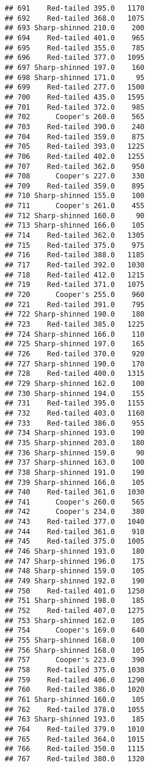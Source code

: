 \documentclass[
]{article}
\begin{document}
\begin{verbatim}
## 691    Red-tailed 395.0   1170
## 692    Red-tailed 368.0   1075
## 693 Sharp-shinned 210.0    200
## 694    Red-tailed 401.0    965
## 695    Red-tailed 355.0    785
## 696    Red-tailed 377.0   1095
## 697 Sharp-shinned 197.0    160
## 698 Sharp-shinned 171.0     95
## 699    Red-tailed 277.0   1500
## 700    Red-tailed 435.0   1595
## 701    Red-tailed 372.0    985
## 702      Cooper's 260.0    565
## 703    Red-tailed 390.0    240
## 704    Red-tailed 359.0    875
## 705    Red-tailed 393.0   1225
## 706    Red-tailed 402.0   1255
## 707    Red-tailed 362.0    950
## 708      Cooper's 227.0    330
## 709    Red-tailed 359.0    895
## 710 Sharp-shinned 155.0    100
## 711      Cooper's 261.0    455
## 712 Sharp-shinned 160.0     90
## 713 Sharp-shinned 166.0    105
## 714    Red-tailed 362.0   1305
## 715    Red-tailed 375.0    975
## 716    Red-tailed 388.0   1185
## 717    Red-tailed 392.0   1030
## 718    Red-tailed 412.0   1215
## 719    Red-tailed 371.0   1075
## 720      Cooper's 255.0    960
## 721    Red-tailed 391.0    795
## 722 Sharp-shinned 190.0    180
## 723    Red-tailed 385.0   1225
## 724 Sharp-shinned 166.0    110
## 725 Sharp-shinned 197.0    165
## 726    Red-tailed 370.0    920
## 727 Sharp-shinned 190.0    170
## 728    Red-tailed 400.0   1315
## 729 Sharp-shinned 162.0    100
## 730 Sharp-shinned 194.0    155
## 731    Red-tailed 395.0   1155
## 732    Red-tailed 403.0   1160
## 733    Red-tailed 386.0    955
## 734 Sharp-shinned 193.0    190
## 735 Sharp-shinned 203.0    180
## 736 Sharp-shinned 159.0     90
## 737 Sharp-shinned 163.0    100
## 738 Sharp-shinned 191.0    190
## 739 Sharp-shinned 166.0    105
## 740    Red-tailed 361.0   1030
## 741      Cooper's 260.0    565
## 742      Cooper's 234.0    380
## 743    Red-tailed 377.0   1040
## 744    Red-tailed 361.0    910
## 745    Red-tailed 375.0   1005
## 746 Sharp-shinned 193.0    180
## 747 Sharp-shinned 196.0    175
## 748 Sharp-shinned 159.0    105
## 749 Sharp-shinned 192.0    190
## 750    Red-tailed 401.0   1250
## 751 Sharp-shinned 198.0    185
## 752    Red-tailed 407.0   1275
## 753 Sharp-shinned 162.0    105
## 754      Cooper's 169.0    640
## 755 Sharp-shinned 168.0    100
## 756 Sharp-shinned 168.0    105
## 757      Cooper's 223.0    390
## 758    Red-tailed 375.0   1030
## 759    Red-tailed 406.0   1290
## 760    Red-tailed 386.0   1020
## 761 Sharp-shinned 160.0    105
## 762    Red-tailed 378.0   1055
## 763 Sharp-shinned 193.0    185
## 764    Red-tailed 379.0   1010
## 765    Red-tailed 364.0   1015
## 766    Red-tailed 350.0   1115
## 767    Red-tailed 380.0   1320

\end{verbatim}
\end{document}
